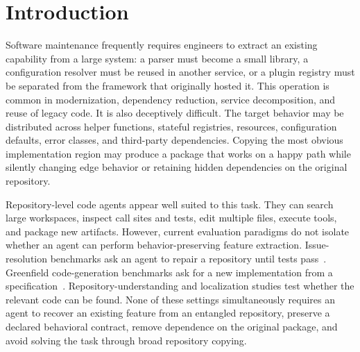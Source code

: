 \documentclass[acmsmall,anonymous,review,screen]{acmart}
\begin{document}


\maketitle

\section{Introduction}
\label{sec:introduction}

Software maintenance frequently requires engineers to extract an existing
capability from a large system: a parser must become a small library, a
configuration resolver must be reused in another service, or a plugin registry
must be separated from the framework that originally hosted it. This operation
is common in modernization, dependency reduction, service decomposition, and
reuse of legacy code. It is also deceptively difficult. The target behavior may
be distributed across helper functions, stateful registries, resources,
configuration defaults, error classes, and third-party dependencies. Copying
the most obvious implementation region may produce a package that works on a
happy path while silently changing edge behavior or retaining hidden
dependencies on the original repository.

Repository-level code agents appear well suited to this task. They can search
large workspaces, inspect call sites and tests, edit multiple files, execute
tools, and package new artifacts. However, current evaluation paradigms do not
isolate whether an agent can perform behavior-preserving feature extraction.
Issue-resolution benchmarks ask an agent to repair a repository until tests
pass~\cite{jimenez2024swebench}. Greenfield code-generation benchmarks ask for
a new implementation from a specification~\cite{chen2021codex}.
Repository-understanding and localization studies test whether the relevant
code can be found. None of these settings simultaneously requires an agent to
recover an existing feature from an entangled repository, preserve a declared
behavioral contract, remove dependence on the original package, and avoid
solving the task through broad repository copying.
\end{document}
